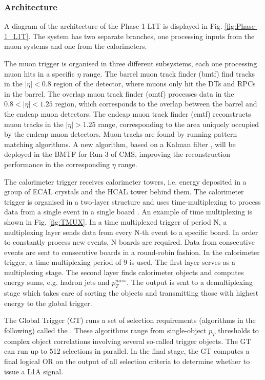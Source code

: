 \documentclass[../../main.tex]{subfiles}
\begin{document}
\subsubsection{Architecture}
\label{Phase-1_l1T_arch}
A diagram of the architecture of the Phase-1 L1T is displayed in Fig. \ref{fig:Phase-1_L1T}. The system has two separate branches, one processing inputs from the muon systems and one from the calorimeters.  



The muon trigger is organised in three different subsystems, each one processing muon hits in a specific $\eta$ range. The barrel muon track finder (\acrshort{bmtf}) find tracks in the $|\eta| < 0.8$ region of the detector, where muons only hit the DTs and RPCs in the barrel. The overlap muon track finder (\acrshort{omtf}) processes data in the $0.8 < |\eta | < 1.25$ region, which corresponds to the overlap between the barrel and the endcap muon detectors. The endcap muon track finder (\acrshort{emtf}) reconstructs muon tracks in the $| \eta | > 1.25$ range, corresponding to the area uniquely occupied by the endcap muon detectors. Muon tracks are found by running pattern matching algorithms. A new algorithm, based on a Kalman filter \cite{Muon_kalman}, will be deployed in the BMTF for Run-3 of CMS, improving the reconstruction performance in the corresponding $\eta$ range.  

The calorimeter trigger receives calorimeter towers, i.e. energy deposited in a group of ECAL crystals and the HCAL tower behind them. The calorimeter trigger is organised in a two-layer structure and uses time-multiplexing to process data from a single event in a single board \cite{TMUX}. An example of time multiplexing is shown in Fig. \ref{fig:TMUX}. In a time multiplexed trigger of period N, a
multiplexing layer sends data from every N-th event to a specific board. In order to constantly process new events, N boards are required. Data from consecutive events are sent to consecutive
boards in a round-robin fashion. In the calorimeter trigger, a time multiplexing period of 9 is used. The first layer serves as a multiplexing stage. The second layer finds calorimeter objects and computes energy sums, e.g. hadron jets and $p^{miss}_T$. The output is sent to a demultiplexing stage which takes care of sorting the objects and transmitting those with highest energy to the global trigger.  

The Global Trigger (GT) runs a set of selection requirements (algorithms in the following) called the . These algorithms range from single-object $p_T$ thresholds to complex object correlations involving several so-called trigger objects. The GT can run up to 512 selections in parallel. In the final stage, the GT computes a final logical OR on the output of all selection criteria to determine whether to issue a L1A signal.
\end{document}
